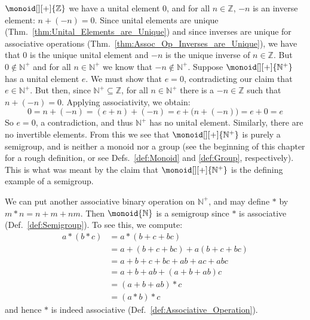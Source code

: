         $\monoid[][+]{\mathbb{Z}}$ we have a unital element 0, and for all
        $n\in\mathbb{Z}$, $\minus{n}$ is an inverse element: $n+(\minus{n})=0$.
        Since unital elements are unique
        (Thm.~\ref{thm:Unital_Elements_are_Unique}) and since inverses are
        unique for associative operations
        (Thm.~\ref{thm:Assoc_Op_Inverses_are_Unique}), we have that 0 is the
        unique unital element and $\minus{n}$ is the unique inverse of
        $n\in\mathbb{Z}$. But $0\notin\mathbb{N}^{+}$ and for all
        $n\in\mathbb{N}^{+}$ we know that $\minus{n}\notin\mathbb{N}^{+}$.
        Suppose $\monoid[][+]{\mathbb{N}^{+}}$ has a unital element $e$. We must
        show that $e=0$, contradicting our claim that $e\in\mathbb{N}^{+}$. But
        then, since $\mathbb{N}^{+}\subseteq\mathbb{Z}$, for all
        $n\in\mathbb{N}^{+}$ there is a $\minus{n}\in\mathbb{Z}$ such that
        $n+(\minus{n})=0$. Applying associativity, we obtain:
        \begin{equation}
            0=n+(\minus{n})=(e+n)+(\minus{n})=e+\big(n+(\minus{n})\big)=e+0=e
        \end{equation}
        So $e=0$, a contradiction, and thus $\mathbb{N}^{+}$ has no unital
        element. Similarly, there are no invertible elements. From this we see
        that $\monoid[][+]{\mathbb{N}^{+}}$ is purely a semigroup, and is
        neither a monoid nor a group (see the beginning of this chapter for a
        rough definition, or see Defs.~\ref{def:Monoid} and \ref{def:Group},
        respectively). This is what was meant by the claim that
        $\monoid[][+]{\mathbb{N}^{+}}$ is the defining example of a semigroup.
        \begin{example}
            We can put another associative binary operation on $\mathbb{N}^{+}$,
            and may define $*$ by $m*n=n+m+nm$. Then $\monoid{\mathbb{N}}$ is a
            semigroup since $*$ is associative (Def.~\ref{def:Semigroup}). To
            see this, we compute:
            \begin{align}
                a*(b*c)&=a*(b+c+bc)\\
                    &=a+(b+c+bc)+a(b+c+bc)\\
                    &=a+b+c+bc+ab+ac+abc\\
                    &=a+b+ab+(a+b+ab)c\\
                    &=(a+b+ab)*c\\
                    &=(a*b)*c
            \end{align}
            and hence $*$ is indeed associative
            (Def.~\ref{def:Associative_Operation}).
        \end{example}
